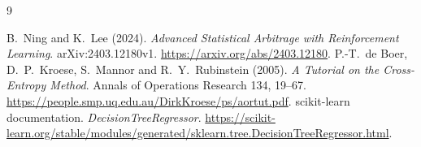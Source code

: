 \documentclass[11pt,letterpaper]{article}
\begin{document}
\begin{thebibliography}{9}
\raggedright
{} B.~Ning and K.~Lee (2024).
\emph{Advanced Statistical Arbitrage with Reinforcement Learning}.
arXiv:2403.12180v1. \url{https://arxiv.org/abs/2403.12180}.
 P.-T.~de Boer, D.~P.~Kroese, S.~Mannor and R.~Y.~Rubinstein (2005).
\emph{A Tutorial on the Cross-Entropy Method}.
Annals of Operations Research 134, 19--67.
\url{https://people.smp.uq.edu.au/DirkKroese/ps/aortut.pdf}.
 scikit-learn documentation. \emph{DecisionTreeRegressor}.
\url{https://scikit-learn.org/stable/modules/generated/sklearn.tree.DecisionTreeRegressor.html}.
\end{thebibliography}

\end{document}
